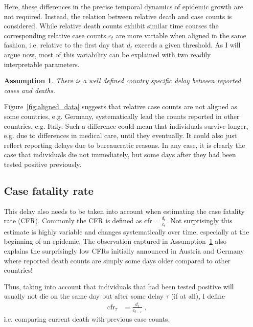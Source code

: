 \documentclass[fullpage,a4paper]{article}
\newcommand{\fig}[1]{Figure~\ref{fig:#1}}
\newcommand{\hyp}[1]{Assumption~\ref{hyp:#1}}
\newtheorem{hypothesis}{Assumption}
\begin{document}
Here, these differences in the precise temporal dynamics of epidemic
growth are not required.  Instead, the relation between relative death
and case counts is considered. While relative death counts exhibit
similar time courses the corresponding relative case counts $c_t$ are
more variable when aligned in the same fashion, i.e. relative to the
first day that $d_t$ exceeds a given threshold. As I will argue now,
most of this variability can be explained with two readily
interpretable parameters.

\begin{hypothesis}
  \label{hyp:delay}
  There is a well defined country specific delay between reported
  cases and deaths.
\end{hypothesis}

\fig{aligned_data} suggests that relative case counts are not aligned
as some countries, e.g. Germany, systematically lead the counts
reported in other countries, e.g. Italy. Such a difference could mean
that individuals survive longer, e.g. due to differences in medical
care, until they eventually. It could also just reflect reporting
delays due to bureaucratic reasons. In any case, it is clearly the
case that individuals die not immediately, but some days after they
had been tested positive previously.

\subsection{Case fatality rate}

This delay also needs to be taken into account when estimating the
case fatality rate (CFR). Commonly the CFR is defined as $\mathrm{cfr}
= \frac{d_t}{c_t}$. Not surprisingly this estimate is highly variable
and changes systematically over time, especially at the beginning of
an epidemic. The observation captured in \hyp{delay} also explains the
surprisingly low CFRs initially announced in Austria and Germany where
reported death counts are simply some days older compared to other
countries!

Thus, taking into account that individuals that had been tested
positive will usually not die on the same day but after some delay
$\tau$ (if at all), I define
\begin{align}
  \label{eq:cfr}
  \mathrm{cfr}_{\tau} &= \frac{d_t}{c_{t - \tau}} \; ,
\end{align}
i.e. comparing current death with previous case counts.
\end{document}
